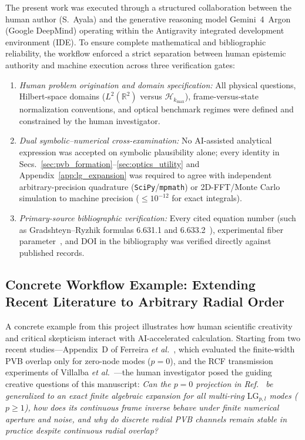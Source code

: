 \documentclass[aps,pra,onecolumn,notitlepage,11pt,tightenlines,amsmath,amssymb,floatfix,longbibliography]{revtex4-2}
\begin{document}
The present work was executed through a structured collaboration between the human author (S.~Ayala) and the generative reasoning model Gemini~4~Argon (Google DeepMind) operating within the Antigravity integrated development environment (IDE). To ensure complete mathematical and bibliographic reliability, the workflow enforced a strict separation between human epistemic authority and machine execution across three verification gates:
\begin{enumerate}
\item \emph{Human problem origination and domain specification:} All physical questions, Hilbert-space domains ($L^2(\mathbb{R}^2)$ versus $\mathcal{H}_{k_{\max}}$), frame-versus-state normalization conventions, and optical benchmark regimes were defined and constrained by the human investigator.
\item \emph{Dual symbolic--numerical cross-examination:} No AI-assisted analytical expression was accepted on symbolic plausibility alone; every identity in Secs.~\ref{sec:pvb_formation}--\ref{sec:optics_utility} and Appendix~\ref{app:lg_expansion} was required to agree with independent arbitrary-precision quadrature (\texttt{SciPy}/\texttt{mpmath}) or 2D-FFT/Monte Carlo simulation to machine precision ($\le 10^{-12}$ for exact integrals).
\item \emph{Primary-source bibliographic verification:} Every cited equation number (such as Gradshteyn--Ryzhik formulas 6.631.1 and 6.633.2~\cite{Gradshteyn2014}), experimental fiber parameter~\cite{Villalba2023}, and DOI in the bibliography was verified directly against published records.
\end{enumerate}

\subsection{Concrete Workflow Example: Extending Recent Literature to Arbitrary Radial Order}
\label{subsec:ai_case_study}

A concrete example from this project illustrates how human scientific creativity and critical skepticism interact with AI-accelerated calculation. Starting from two recent studies—Appendix~D of Ferreira \emph{et al.}~\cite{Ferreira2026}, which evaluated the finite-width PVB overlap only for zero-node modes ($p = 0$), and the RCF transmission experiments of Villalba \emph{et al.}~\cite{Villalba2023}—the human investigator posed the guiding creative questions of this manuscript: \emph{Can the $p = 0$ projection in Ref.~\cite{Ferreira2026} be generalized to an exact finite algebraic expansion for all multi-ring $\mathrm{LG}_{p,l}$ modes ($p \ge 1$), how does its continuous frame inverse behave under finite numerical aperture and noise, and why do discrete radial PVB channels remain stable in practice despite continuous radial overlap?}
\end{document}
